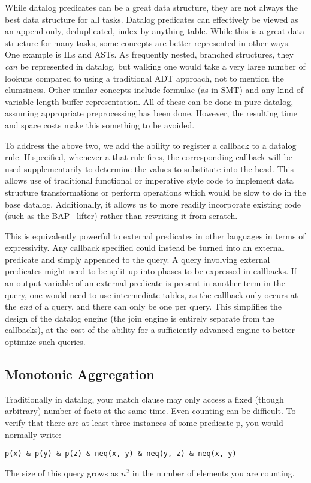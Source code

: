 While datalog predicates can be a great data structure, they are not always the best data structure for all tasks.
Datalog predicates can effectively be viewed as an append-only, deduplicated, index-by-anything table.
While this is a great data structure for many tasks, some concepts are better represented in other ways.
One example is ILs and ASTs.
As frequently nested, branched structures, they \emph{can} be represented in datalog, but walking one would take a very large number of lookups compared to using a traditional ADT approach, not to mention the clumsiness.
Other similar concepts include formulae (as in SMT) and any kind of variable-length buffer representation.
All of these can be done in pure datalog, assuming appropriate preprocessing has been done.
However, the resulting time and space costs make this something to be avoided.

To address the above two, we add the ability to register a callback to a datalog rule.
If specified, whenever a that rule fires, the corresponding callback will be used supplementarily to determine the values to substitute into the head.
This allows use of traditional functional or imperative style code to implement data structure transformations or perform operations which would be slow to do in the base datalog.
Additionally, it allows us to more readily incorporate existing code (such as the BAP~\cite{bap} lifter) rather than rewriting it from scratch.

This is equivalently powerful to external predicates in other languages in terms of expressivity.
Any callback specified could instead be turned into an external predicate and simply appended to the query.
A query involving external predicates might need to be split up into phases to be expressed in callbacks.
If an output variable of an external predicate is present in another term in the query, one would need to use intermediate tables, as the callback only occurs at the \emph{end} of a query, and there can only be one per query.
This simplifies the design of the datalog engine (the join engine is entirely separate from the callbacks), at the cost of the ability for a sufficiently advanced engine to better optimize such queries.

\subsection{Monotonic Aggregation}
Traditionally in datalog, your match clause may only access a fixed (though arbitrary) number of facts at the same time.
Even counting can be difficult.
To verify that there are at least three instances of some predicate p, you would normally write:
\begin{verbatim}
p(x) & p(y) & p(z) & neq(x, y) & neq(y, z) & neq(x, y)
\end{verbatim}
The size of this query grows as $n^2$ in the number of elements you are counting.

